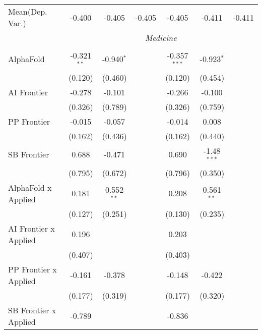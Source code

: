 \begin{tabular}{lcccccc}
Mean(Dep. Var.) & -0.400 & -0.405 & -0.405 & -0.405 & -0.411 & -0.411 \\
 & \multicolumn{6}{c}{\textit{Medicine}} \\ \\
   AlphaFold                      & -0.321$^{**}$ & -0.940$^{*}$ &               & -0.357$^{***}$ & -0.923$^{*}$  &   \\   
                                  & (0.120)       & (0.460)      &               & (0.120)        & (0.454)       &   \\   
   AI Frontier                    & -0.278        & -0.101       &               & -0.266         & -0.100        &   \\   
                                  & (0.326)       & (0.789)      &               & (0.326)        & (0.759)       &   \\   
   PP Frontier                    & -0.015        & -0.057       &               & -0.014         & 0.008         &   \\   
                                  & (0.162)       & (0.436)      &               & (0.162)        & (0.440)       &   \\   
   SB Frontier                    & 0.688         & -0.471       &               & 0.690          & -1.48$^{***}$ &   \\   
                                  & (0.795)       & (0.672)      &               & (0.796)        & (0.350)       &   \\   
   AlphaFold x Applied            & 0.181         & 0.552$^{**}$ &               & 0.208          & 0.561$^{**}$  &   \\   
                                  & (0.127)       & (0.251)      &               & (0.130)        & (0.235)       &   \\   
   AI Frontier x Applied          & 0.196         &              &               & 0.203          &               &   \\   
                                  & (0.407)       &              &               & (0.403)        &               &   \\   
   PP Frontier x Applied          & -0.161        & -0.378       &               & -0.148         & -0.422        &   \\   
                                  & (0.177)       & (0.319)      &               & (0.177)        & (0.320)       &   \\   
   SB Frontier x Applied          & -0.789        &              &               & -0.836         &               &   \\   

\end{tabular}

